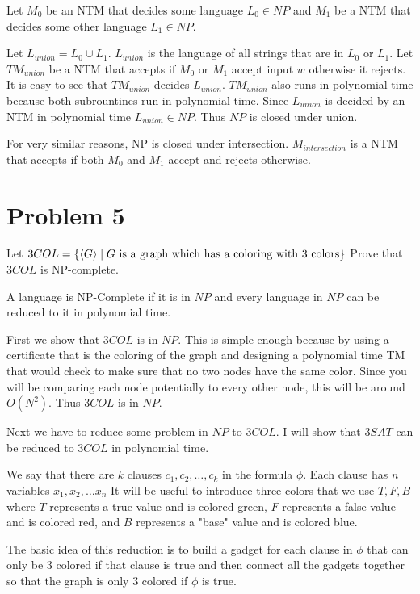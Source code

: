 \documentclass[12pt]{article}
\begin{document}
Let $M_{0}$ be an NTM that decides some language $L_0 \in NP$ and $M_{1}$ be a NTM that decides some other language $L_1 \in NP$.


Let $L_{union} = L_0 \cup L_1$. $L_{union}$ is the language of all strings that are in $L_0$ or $L_1$. Let $TM_{union}$ be a NTM that accepts if $M_0$ or $M_1$ accept input $w$ otherwise it rejects. It is easy to see that $TM_{union}$ decides $L_{union}$. $TM_{union}$ also runs in polynomial time because both subrountines run in polynomial time. Since $L_{union}$ is decided by an NTM in polynomial time $L_{union} \in NP$. Thus $NP$ is closed under union.

For very similar reasons, NP is closed under intersection. $M_{intersection}$ is a NTM that accepts if both $M_0$ and $M_1$ accept and rejects otherwise.

\section*{Problem 5}

\begin{questionbox}
	Let $3COL = \{\braket{G} \mid G \text{ is a graph which has a coloring with 3 colors} \}$ Prove that $3COL$ is
NP-complete.
\end{questionbox}

A language is NP-Complete if it is in $NP$ and every language in $NP$ can be reduced to it in polynomial time.

First we show that $3COL$ is in $NP$. This is simple enough because by using a certificate that is the coloring of the graph and designing a polynomial time TM that would check to make sure that no two nodes have the same color. Since you will be comparing each node potentially to every other node, this will be around $O(N^2)$. Thus $3COL$ is in $NP$.

Next we have to reduce some problem in $NP$ to $3COL$. I will show that $3SAT$ can be reduced to $3COL$ in polynomial time.

We say that there are $k$ clauses $c_1, c_2, \dots, c_k$ in the formula $\phi$. Each clause has $n$ variables $x_1, x_2, \dots x_n$
It will be useful to introduce three colors that we use $T, F, B$ where $T$ represents a true value and is colored green, $F$ represents a false value and is colored red, and $B$ represents a "base" value and is colored blue.

The basic idea of this reduction is to build a gadget for each clause in $\phi$ that can only be 3 colored if that clause is true and then connect all the gadgets together so that the graph is only 3 colored if $\phi$ is true.
\end{document}
